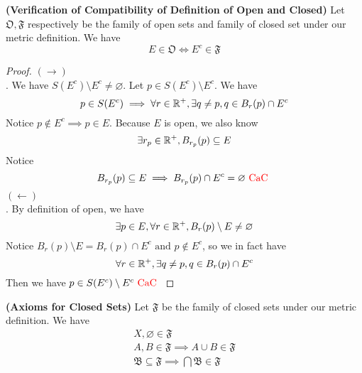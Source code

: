 \documentclass{report}
\begin{document}
\begin{theorem}
\label{2.7.11}
\textbf{(Verification of Compatibility of Definition of Open and Closed)} 
Let $\mathfrak{O},\mathfrak{F}$ respectively be the family of open sets and family of closed set under our metric definition. We have
\begin{equation}
E\in \mathfrak{O}\iff E^c\in\mathfrak{F}
\end{equation}
\end{theorem}
\begin{proof}
$(\longrightarrow)$\\

. We have $S(E^c)\setminus E^c\neq \varnothing$. Let $p\in S(E^c)\setminus E^c$. We have
\begin{equation}
p\in  S(E^c)\implies \forall r\in\mathbb{R}^+, \exists q\neq p, q\in B_{r}(p)\cap E^c
\end{equation}
 Notice $p\not\in E^c\implies p\in  E$. Because $E$ is open, we also know
\begin{equation}
\exists r_p\in\mathbb{R}^+, B_{r_p}(p)\subseteq E
\end{equation}
Notice
\begin{equation}
B_{r_p}(p)\subseteq E\implies B_{r_p}(p)\cap E^c=\varnothing\text{ \textcolor{red}{CaC} }
\end{equation}
$(\longleftarrow)$\\

. By definition of open, we have
\begin{equation}
\exists p \in E, \forall r\in\mathbb{R}^+, B_r(p)\setminus E\neq \varnothing
\end{equation}
Notice $B_r(p)\setminus E=B_r(p)\cap E^c\text{ and }p\not\in E^c$, so we in fact have
\begin{equation}
\forall r\in\mathbb{R}^+,\exists q\neq p, q \in B_r(p)\cap E^c 
\end{equation}
Then we have $p\in  S(E^c)\setminus E^c\text{ \textcolor{red}{CaC} }$
\end{proof}
\begin{corollary}
\label{2.7.12}
\textbf{(Axioms for Closed Sets)} Let $\mathfrak{F}$ be the family of closed sets under our metric definition. We have
\begin{gather}
X,\varnothing \in \mathfrak{F}\\
A,B\in\mathfrak{F}\implies A\cup  B\in\mathfrak{F}\\
\mathfrak{B}\subseteq \mathfrak{F}\implies \bigcap \mathfrak{B}\in \mathfrak{F}
\end{gather}
\end{corollary}
\end{document}
